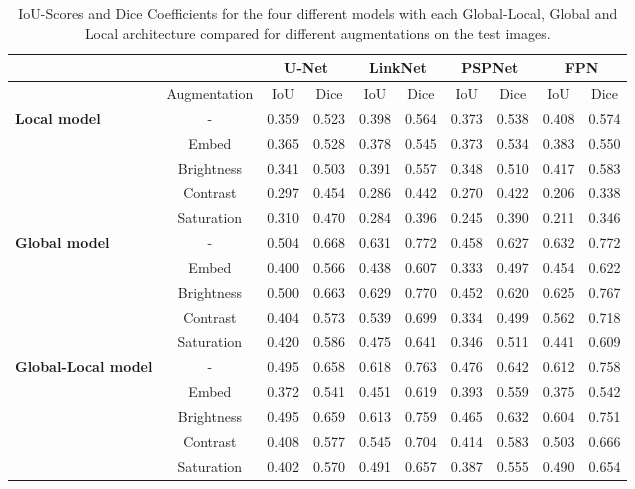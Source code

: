 \begin{table}[htb!]
	\centering
	\begin{tabular}{l | c ||c | c || c | c || c | c || c | c||}
	& & \multicolumn{2}{|c||}{U-Net} & \multicolumn{2}{|c||}{LinkNet} & \multicolumn{2}{|c||}{PSPNet} & \multicolumn{2}{|c||}{FPN} \\
	\hline
	& Augmentation & IoU & Dice & IoU & Dice & IoU & Dice & IoU & Dice \\
	\hline\hline
	\multirow{5}{*}{\textbf{Local model}} & - & 0.359 & 0.523 & 0.398 & 0.564 & 0.373 & 0.538 & 0.408 & 0.574 \\
	& Embed & 0.365 & 0.528 & 0.378 & 0.545 & 0.373 & 0.534 & 0.383 & 0.550\\
	& Brightness & 0.341 & 0.503 & 0.391 & 0.557 & 0.348 & 0.510 & 0.417 & 0.583\\
	& Contrast & 0.297 & 0.454 & 0.286 & 0.442 & 0.270 & 0.422 & 0.206 & 0.338\\
	& Saturation & 0.310 & 0.470 & 0.284 & 0.396 & 0.245 & 0.390 & 0.211 & 0.346\\
	\hline
	\multirow{5}{*}{\textbf{Global model}} & - & 0.504 & 0.668 & 0.631 & 0.772 & 0.458 & 0.627 & 0.632 & 0.772 \\
	& Embed & 0.400 & 0.566 & 0.438 & 0.607 & 0.333 & 0.497 & 0.454 & 0.622\\
	& Brightness & 0.500 & 0.663 & 0.629 & 0.770 & 0.452 & 0.620 & 0.625 & 0.767\\
	& Contrast & 0.404 & 0.573 & 0.539 & 0.699 & 0.334 & 0.499 & 0.562 & 0.718\\
	& Saturation & 0.420 & 0.586 & 0.475 & 0.641 & 0.346 & 0.511 & 0.441 & 0.609\\
	\hline
	\multirow{5}{*}{\textbf{Global-Local model}} & - & 0.495 & 0.658 & 0.618 & 0.763 & 0.476 & 0.642 & 0.612 & 0.758\\
	& Embed & 0.372 & 0.541 & 0.451 & 0.619 & 0.393 & 0.559 & 0.375 & 0.542\\
	& Brightness & 0.495 & 0.659 & 0.613 & 0.759 & 0.465 & 0.632 & 0.604 & 0.751\\
	& Contrast & 0.408 & 0.577& 0.545 & 0.704 & 0.414 & 0.583 & 0.503 & 0.666\\
	& Saturation & 0.402 & 0.570 & 0.491 & 0.657 & 0.387 & 0.555 & 0.490 & 0.654\\
	\end{tabular}
	\caption{IoU-Scores and Dice Coefficients for the four different models with each Global-Local, Global and Local architecture compared for different augmentations on the test images.}
	\label{table:augmentation-comparison}
\end{table}

